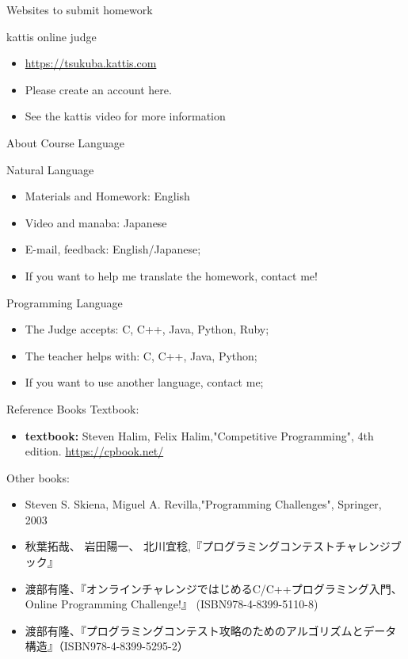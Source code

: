 \begin{frame}{Websites to submit homework}
  \begin{block}{kattis online judge}
    \begin{itemize}
      \item \url{https://tsukuba.kattis.com}
      \item Please create an account here.
      \item See the kattis video for more information
    \end{itemize}
  \end{block}
\end{frame}

\begin{frame}{About Course Language}
  \begin{block}{Natural Language}
    \begin{itemize}
      \item Materials and Homework: English
      \item Video and manaba: Japanese
      \item E-mail, feedback: English/Japanese;
      \item If you want to help me translate the homework, contact me!
    \end{itemize}
  \end{block}

  \begin{block}{Programming Language}
    \begin{itemize}
      \item The Judge accepts: C, C++, Java, Python, Ruby;
      \item The teacher helps with: C, C++, Java, Python;
      \item If you want to use another language, contact me;
    \end{itemize}
  \end{block}
\end{frame}

\begin{frame}{Reference Books}
  Textbook:
  \begin{itemize}
    \item {\bf textbook:} Steven Halim, Felix Halim,"Competitive Programming", 4th edition. \url{https://cpbook.net/}
  \end{itemize}
  \bigskip

  Other books:
  \begin{itemize}
    \item Steven S. Skiena, Miguel A. Revilla,"Programming Challenges", Springer, 2003
    \item 秋葉拓哉、 岩田陽一、 北川宜稔,『プログラミングコンテストチャレンジブック』
    \item 渡部有隆、『オンラインチャレンジではじめるC/C++プログラミング入門、Online Programming Challenge!』 (ISBN978-4-8399-5110-8)
    \item 渡部有隆、『プログラミングコンテスト攻略のためのアルゴリズムとデータ構造』（ISBN978-4-8399-5295-2）
  \end{itemize}
\end{frame}

